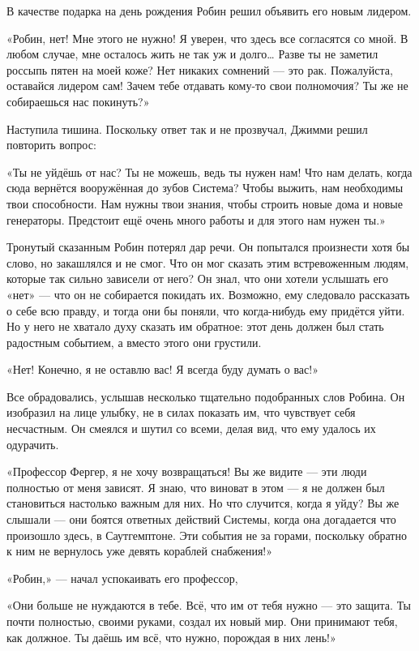 \documentclass[a5paper, 9pt,
final, openany, twoside=true]{memoir}
\begin{document}
В качестве подарка на день рождения Робин решил объявить его новым лидером.\bigskip

«Робин, нет! Мне этого не нужно! Я уверен, что здесь все согласятся со мной. В любом случае, мне осталось жить не так уж и долго… Разве ты не заметил россыпь пятен на моей коже? Нет никаких сомнений — это рак. Пожалуйста, оставайся лидером сам! Зачем тебе отдавать кому-то свои полномочия? Ты же не собираешься нас покинуть?»

Наступила тишина. Поскольку ответ так и не прозвучал, Джимми решил повторить вопрос:

«Ты не уйдёшь от нас? Ты не можешь, ведь ты нужен нам! Что нам делать, когда сюда вернётся вооружённая до зубов Система? Чтобы выжить, нам необходимы твои способности. Нам нужны твои знания, чтобы строить новые дома и новые генераторы. Предстоит ещё очень много работы и для этого нам нужен ты.»

Тронутый сказанным Робин потерял дар речи. Он попытался произнести хотя бы слово, но закашлялся и не смог. Что он мог сказать этим встревоженным людям, которые так сильно зависели от него? Он знал, что они хотели услышать его «нет» — что он не собирается покидать их. Возможно, ему следовало рассказать о себе всю правду, и тогда они бы поняли, что когда-нибудь ему придётся уйти. Но у него не хватало духу сказать им обратное: этот день должен был стать радостным событием, а вместо этого они грустили.

«Нет! Конечно, я не оставлю вас! Я всегда буду думать о вас!»

Все обрадовались, услышав несколько тщательно подобранных слов Робина. Он изобразил на лице улыбку, не в силах показать им, что чувствует себя несчастным. Он смеялся и шутил со всеми, делая вид, что ему удалось их одурачить.\bigskip

«Профессор Фергер, я не хочу возвращаться! Вы же видите — эти люди полностью от меня зависят. Я знаю, что виноват в этом — я не должен был становиться настолько важным для них. Но что случится, когда я уйду? Вы же слышали — они боятся ответных действий Системы, когда она догадается что произошло здесь, в Саутгемптоне. Эти события не за горами, поскольку обратно к ним не вернулось уже девять кораблей снабжения!»

«Робин,» — начал успокаивать его профессор,

«Они больше не нуждаются в тебе. Всё, что им от тебя нужно — это защита. Ты почти полностью, своими руками, создал их новый мир. Они принимают тебя, как должное. Ты даёшь им всё, что нужно, порождая в них лень!»
\end{document}
